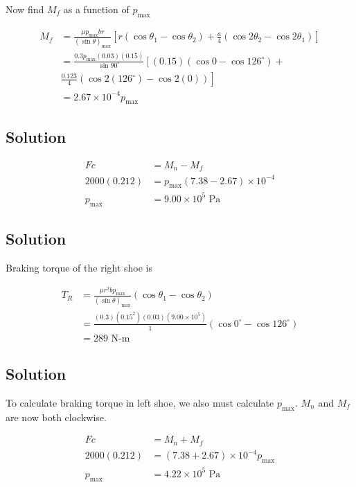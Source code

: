 \documentclass[
10pt,
a4paper,
openany,
svgnames,
]{book}
\begin{document}
Now find \(M_f\) as a function of \(p_{\max}\)

\begin{align*}
    M_f &= \frac{\mu p_{\max} br}{(\sin \theta)_{\max}} \left[ r( \cos \theta_1 - \cos \theta_2) + \frac{a}{4}(\cos 2\theta_2 - \cos 2\theta_1) \right] \\
        &= \frac{0.3 p_{\max} (0.03)(0.15)}{\sin 90^{\circ}} \left[ (0.15)(\cos 0 - \cos 126^{\circ}) + \right. \\
         & \left. \frac{0.123}{4}(\cos 2(126^{\circ}) - \cos 2(0)) \right] \\
        &= 2.67 \times 10^{-4} p_{\max}
\end{align*}

\subsection*{Solution}
\label{sec:org41c6f26}

\begin{align*}
    Fc &= M_n - M_f \\
    2000(0.212) &= p_{\max}(7.38 - 2.67) \times 10^{-4} \\
    p_{\max} &= 9.00 \times 10^5 \text{ Pa}
\end{align*}

\subsection*{Solution}
\label{sec:org371357f}

Braking torque of the right shoe is

\begin{align*}
    T_R &= \frac{\mu r^2 bp_{\max}}{(\sin \theta)_{\max}} (\cos \theta_1 - \cos \theta_2) \\
        &= \frac{(0.3)(0.15^2)(0.03)(9.00 \times 10^5)}{1} (\cos 0^{\circ} - \cos 126^{\circ}) \\
        &= 289 \text{ N-m}
\end{align*}

\subsection*{Solution}
\label{sec:org8c308d8}

To calculate braking torque in left shoe, we also must calculate \(p_{\max}\). \(M_n\) and \(M_f\) are now both clockwise.

\begin{align*}
    Fc &= M_n + M_f \\
    2000(0.212) &= (7.38 + 2.67) \times 10^{-4} p_{\max} \\
    p_{\max} &= 4.22 \times 10^5 \text{ Pa}
\end{align*}
\end{document}
